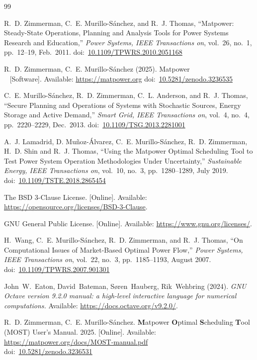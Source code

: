 \documentclass[12pt]{article}
\newcommand{\matpower}[0]{{\sc Matpower}}
\newcommand{\most}[0]{{MOST}}
\newcommand{\mostname}[0]{{{\bf M}{\sc atpower} \textbf{O}ptimal \textbf{S}cheduling \textbf{T}ool}}
\newcommand{\currentmostmanurl}[0]{https://matpower.org/docs/MOST-manual.pdf}
\newcommand{\doi}[1]{doi:~\href{https://doi.org/#1}{#1}}
\numberwithin{equation}{section}
\numberwithin{table}{section}
\numberwithin{figure}{section}
\begin{document}
\clearpage
\begin{thebibliography}{99}

R.~D. Zimmerman, C.~E. Murillo-S{\'a}nchez, and R.~J. Thomas, ``\matpower{}: Steady-State Operations, Planning and Analysis Tools for Power Systems Research and Education,'' \emph{Power Systems, IEEE Transactions on}, vol.~26, no.~1, pp.~12--19, Feb.~2011.
\doi{10.1109/TPWRS.2010.2051168}

R.~D. Zimmerman, C.~E. Murillo-S{\'a}nchez (2025). \matpower{}\\~
[Software]. Available: \url{https://matpower.org}
\doi{10.5281/zenodo.3236535}

C.~E. Murillo-S{\'a}nchez, R.~D. Zimmerman, C.~L. Anderson, and R.~J. Thomas, ``Secure Planning and Operations of Systems with Stochastic Sources, Energy Storage and Active Demand,'' \emph{Smart Grid, IEEE Transactions on}, vol.~4, no.~4, pp.~2220--2229, Dec.~2013.
\doi{10.1109/TSG.2013.2281001}

A.~J. Lamadrid, D. Mu{\~n}oz-{\'A}lvarez, C.~E. Murillo-S{\'a}nchez, R.~D. Zimmerman, H.~D. Shin and R.~J. Thomas, ``Using the \matpower{} Optimal Scheduling Tool to Test Power System Operation Methodologies Under Uncertainty,'' \emph{Sustainable Energy, IEEE Transactions on}, vol.~10, no.~3, pp.~1280--1289, July 2019.
\doi{10.1109/TSTE.2018.2865454}

The BSD 3-Clause License. [Online]. Available: \url{https://opensource.org/licenses/BSD-3-Clause}.

GNU General Public License. [Online]. Available: \url{https://www.gnu.org/licenses/}.

H.~Wang, C.~E. Murillo-S{\'a}nchez, R.~D. Zimmerman, and R.~J. Thomas, ``On
Computational Issues of Market-Based Optimal Power Flow,'' \emph{Power
Systems, IEEE Transactions on}, vol.~22, no.~3, pp.~1185--1193, August 2007.
\doi{10.1109/TPWRS.2007.901301}

John~W.~Eaton, David~Bateman, S{\o}ren~Hauberg, Rik~Wehbring (2024). \emph{GNU Octave version 9.2.0 manual: a high-level interactive language for numerical computations.} Available: \url{https://docs.octave.org/v9.2.0/}.

R.~D. Zimmerman, C.~E. Murillo-S{\'a}nchez. \mostname{} (\most{}) User's Manual. 2025. [Online]. Available: \url{\currentmostmanurl}\\
\doi{10.5281/zenodo.3236531}


\end{thebibliography}
\end{document}
